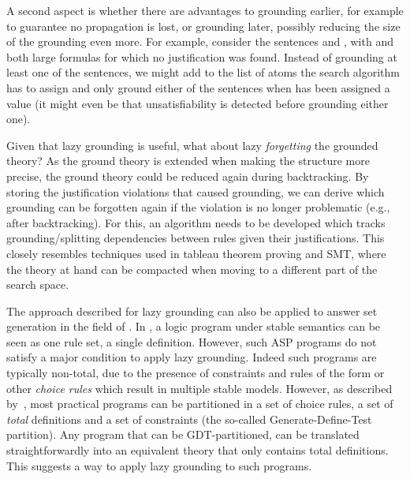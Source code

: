 \documentclass[11pt]{article}
\newcommand{\logicname}[1]{\text{\sc #1}\xspace}
\newcommand{\foid}{\logicname{FO(\ensuremath{ID})}}
\theoremstyle{plain}
\theoremstyle{definition}
\theoremstyle{example_basic}
\theoremstyle{example_contd}
\theoremstyle{plain}
\begin{document}
A second aspect is whether there are advantages to grounding earlier, for example to guarantee no propagation is lost, or grounding later, possibly reducing the size of the grounding even more. For example, consider the sentences  and , with  and  both large formulas for which no justification was found. Instead of grounding at least one of the sentences, we might add  to the list of atoms the search algorithm has to assign and only ground either of the sentences when  has been assigned a value (it might even be that unsatisfiability is detected before grounding either one).

Given that lazy grounding is useful, what about lazy \emph{forgetting}  the grounded theory? As the ground theory is extended when making the structure more precise, the ground theory could be reduced again during backtracking. By storing the justification violations that caused grounding, we can derive which grounding can be forgotten again if the violation is no longer problematic (e.g., after backtracking). For this, an algorithm needs to be developed which tracks grounding/splitting dependencies between rules given their justifications. This closely resembles techniques used in tableau theorem proving and SMT, where the theory at hand can be compacted when moving to a different part of the search space.

The approach described for lazy grounding can also be applied to answer set generation in the field of \ASP. In \ASP, a logic program under stable semantics can be seen as one rule set, a  single definition. However, such ASP programs do not satisfy a major condition  to apply lazy grounding. Indeed such programs are typically non-total, due to the presence of constraints and rules of the form  or other \emph{choice rules} which result in multiple stable models.  However, as described by~, most practical \ASP programs can be partitioned in a set of choice rules, a set of \emph{total} definitions and a set of constraints (the so-called Generate-Define-Test partition).  Any \ASP program that can be GDT-partitioned, can be translated straightforwardly into an equivalent \foid theory that only contains total definitions. This suggests a way to apply lazy grounding  to such \ASP programs.
\end{document}
